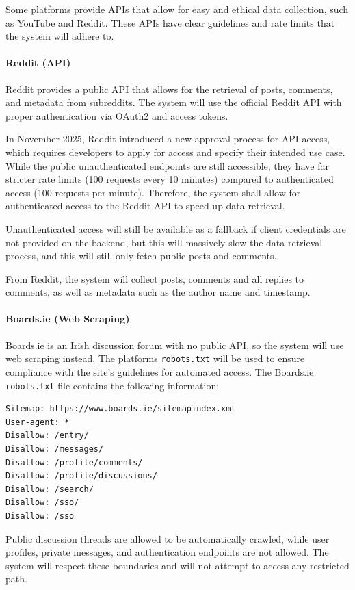 \documentclass[12pt, a4paper]{article}
\begin{document}
Some platforms provide APIs that allow for easy and ethical data collection, such as YouTube and Reddit. These APIs have clear guidelines and rate limits that the system will adhere to. \cite{chugani2025ethicalscraping}

\paragraph{Reddit (API)}
Reddit provides a public API that allows for the retrieval of posts, comments, and metadata from subreddits. The system will use the official Reddit API with proper authentication via OAuth2 and access tokens. 

In November 2025, Reddit introduced a new approval process for API access, which requires developers to apply for access and specify their intended use case. While the public unauthenticated endpoints are still accessible, they have far stricter rate limits (100 requests every 10 minutes) compared to authenticated access (100 requests per minute). Therefore, the system shall allow for authenticated access to the Reddit API to speed up data retrieval.

Unauthenticated access will still be available as a fallback if client credentials are not provided on the backend, but this will massively slow the data retrieval process, and this will still only fetch public posts and comments.

From Reddit, the system will collect posts, comments and all replies to comments, as well as metadata such as the author name and timestamp.

\paragraph{Boards.ie (Web Scraping)}
Boards.ie is an Irish discussion forum with no public API, so the system will use web scraping instead. The platforms \texttt{robots.txt} will be used to ensure compliance with the site's guidelines for automated access. The Boards.ie \texttt{robots.txt} file contains the following information:

\begin{verbatim}
Sitemap: https://www.boards.ie/sitemapindex.xml
User-agent: *
Disallow: /entry/
Disallow: /messages/
Disallow: /profile/comments/
Disallow: /profile/discussions/
Disallow: /search/
Disallow: /sso/
Disallow: /sso
\end{verbatim}

Public discussion threads are allowed to be automatically crawled, while user profiles, private messages, and authentication endpoints are not allowed. The system will respect these boundaries and will not attempt to access any restricted path.
\end{document}
